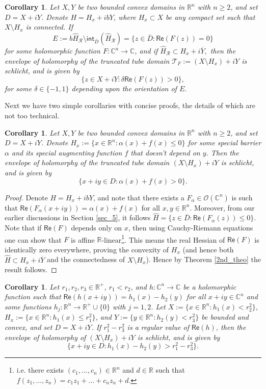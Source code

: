 \documentclass[12pt,reqno, a4paper]{amsart}
\newtheorem{corollary}[theorem]{Corollary}
\theoremstyle{definition}
\theoremstyle{definition}
\numberwithin{equation}{section}
\def\R{\mathbb{R}}                              %
\def\C{\mathbb{C}}                              %
\begin{document}
\begin{corollary}
	Let $X,Y$ be two bounded convex domains in $\R^n$ with $n\geq 2$, and set $D=X+iY$. Denote $H=H_x+ibY$, where $H_x\subset X$ be any compact set such that $X\setminus H_x$ is connected. If $$E:=b\widehat{H}_{\mathcal{R}} \setminus\textsf{int}_{\overline{D}}(\widehat{H}_{\mathcal{R}})=\{z\in \overline{D}: \textsf{Re}(F(z))=0\}$$ for some holomorphic function $F:\C^n \to \C$, and if $\widehat{H}_{\mathcal{R}}\subset H_x+i\overline{Y},$ then the envelope of holomorphy of the truncated tube domain $\mathcal
	T_{F}:=(X\setminus H_x)+iY$ is schlicht, and is given by $$\{z\in X+iY:\delta\textsf{Re}(F(z))>0\},$$ for some $\delta\in \{-1,1\}$ depending upon the orientation of $E.$
\end{corollary}

Next we have two simple corollaries with concise proofs, the details of which are not too technical.
\begin{corollary}
Let $X,Y$ be two bounded convex domains in $\R^n$ with $n\geq 2$, and set $D=X+iY$. Denote $H_x:=\{x\in \R^n: \alpha(x)+f(x)\leq 0\}$ for some special barrier $\alpha$ and its special augmenting function $f$ that doesn't depend on $y$. Then the envelope of holomorphy of the truncated tube domain $(X\setminus H_x)+iY$ is schlicht, and is given by $$\{x+iy\in D: \alpha(x)+f(x)>0\}.$$ 
\end{corollary}
\begin{proof}
Denote $H=H_x+ibY$, and note that  there exists a $F_{\alpha}\in \mathcal{O}(\C^n)$ is such that $\textsf{Re}(F_{\alpha}(x+iy))=\alpha(x)+f(x)$ for all $x,y\in \R^n.$ Moreover, from our earlier discussions in Section \ref{sec_5}, it follows $\widehat{H}=\{z\in \overline{D}: \textsf{Re}(F_{\alpha}(z))\leq0\}.$  
 Note that if $\textsf{Re}(F)$ depends only on $x$, then using Cauchy-Riemann equations one can show that $F$ is affine $\R$-linear\footnote{i.e. there exists $(c_1,\ldots, c_n)\in \R^n$ and $d\in \R$ such that $f(z_1,\ldots,z_n)=c_1z_1+\ldots+c_nz_n+d$.}. This means the real Hessian of $\textsf{Re}(F)$ is identically zero everywhere, proving the convexity of $H_x$ (and hence both $\widehat{H}\subset H_x+i\overline{Y}$ and the connectedness of $X\setminus H_x$). Hence by Theorem \ref{2nd_theo} the result follows. 
\end{proof}


\begin{corollary}
Let $r_1, r_2, r_3\in \R^+$, $r_1<r_2$, and $h:\C^n \to \C$ be a holomorphic function such that $\textsf{Re}(h(x+iy))=h_1(x)-h_2(y)$ for all $x+iy\in \C^n$ and some functions $h_j:\R^n\to \R^+\cup \{0\}$ with $j=1,2$. Let ${X:=\{x\in \R^n: h_1(x)<r_2^2\}}$, $H_x:=\{x\in \R^n: h_1(x)\leq r_1^2\}$, and ${Y:=\{y\in \R^n: h_2(y)<r_3^2\}}$ be bounded and convex, and set $D=X+iY$. If $r_1^2-r_3^2$ is a regular value of $\textsf{Re}(h)$, then the envelope of holomorphy of ${(X\setminus H_x)+iY}$ is schlicht, and is given by $$\{x+iy\in D: h_1(x)-h_2(y)> r_1^2-r_3^2\}.$$
\end{corollary}
\end{document}
